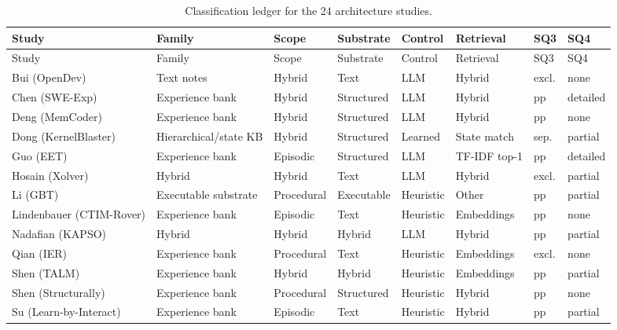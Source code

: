 \scriptsize
\setlength{\tabcolsep}{2pt}
\begin{longtable}{@{}
  >{\raggedright\arraybackslash}p{2.15cm}
  >{\raggedright\arraybackslash}p{2.05cm}
  >{\raggedright\arraybackslash}p{1.35cm}
  >{\raggedright\arraybackslash}p{1.45cm}
  >{\raggedright\arraybackslash}p{1.2cm}
  >{\raggedright\arraybackslash}p{1.55cm}
  >{\centering\arraybackslash}p{0.75cm}
  >{\centering\arraybackslash}p{0.95cm}
@{}}
  \caption{Classification ledger for the 24 architecture studies.}
  \label{tab:classification-ledger} \\
  \toprule
  Study & Family & Scope & Substrate & Control & Retrieval & SQ3 & SQ4 \\
  \midrule
  \endfirsthead
  \toprule
  Study & Family & Scope & Substrate & Control & Retrieval & SQ3 & SQ4 \\
  \midrule
  \endhead
  \bottomrule
  \endfoot
  Bui (OpenDev) & Text notes & Hybrid & Text & LLM & Hybrid & excl. & none \\
  Chen (SWE-Exp) & Experience bank & Hybrid & Structured & LLM & Hybrid & pp & detailed \\
  Deng (MemCoder) & Experience bank & Hybrid & Structured & LLM & Hybrid & pp & none \\
  Dong (KernelBlaster) & Hierarchical/state KB & Hybrid & Structured & Learned & State match & sep. & partial \\
  Guo (EET) & Experience bank & Episodic & Structured & LLM & TF-IDF top-1 & pp & detailed \\
  Hosain (Xolver) & Hybrid & Hybrid & Text & LLM & Hybrid & excl. & partial \\
  Li (GBT) & Executable substrate & Procedural & Executable & Heuristic & Other & pp & partial \\
  Lindenbauer (CTIM-Rover) & Experience bank & Episodic & Text & Heuristic & Embeddings & pp & none \\
  Nadafian (KAPSO) & Hybrid & Hybrid & Hybrid & LLM & Hybrid & pp & partial \\
  Qian (IER) & Experience bank & Procedural & Text & Heuristic & Embeddings & excl. & none \\
  Shen (TALM) & Experience bank & Hybrid & Hybrid & Heuristic & Embeddings & pp & partial \\
  Shen (Structurally) & Experience bank & Procedural & Structured & Heuristic & Hybrid & pp & none \\
  Su (Learn-by-Interact) & Experience bank & Episodic & Text & Heuristic & Hybrid & pp & partial \\

\end{longtable}

